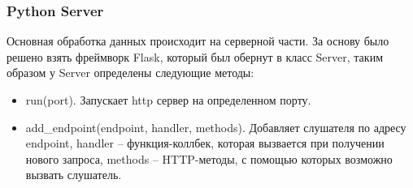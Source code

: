 \subsubsection{Python Server}
Основная обработка данных происходит на серверной части. За основу было решено взять фреймворк Flask, который был обернут в класс Server, таким образом у Server определены следующие методы:
\begin{itemize}
  \item run(port). Запускает http сервер на определенном порту.
  \item add\_endpoint(endpoint, handler, methods). Добавляет слушателя по адресу endpoint, handler -- функция-коллбек, которая вызвается при получении нового запроса, methods -- HTTP-методы, с помощью которых возможно вызвать слушатель.
\end{itemize}

